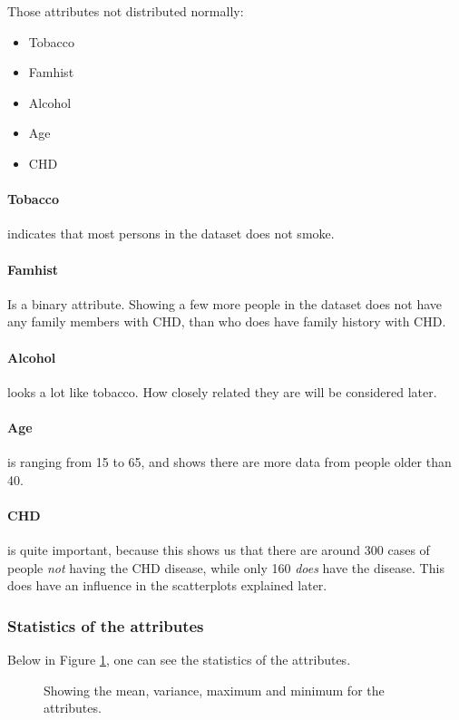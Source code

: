 Those attributes not distributed normally:
\begin{itemize}
\item Tobacco
\item Famhist
\item Alcohol
\item Age
\item CHD
\end{itemize}

\paragraph{Tobacco} indicates that most persons in the dataset does not smoke.
\paragraph{Famhist} Is a binary attribute. Showing a few more people in the dataset does not have any family members with CHD, than who does have family history with CHD.
\paragraph{Alcohol} looks a lot like tobacco. How closely related they are will be considered later.
\paragraph{Age} is ranging from 15 to 65, and shows there are more data from people older than 40.
\paragraph{CHD} is quite important, because this shows us that there are around 300 cases of people \textit{not} having the CHD disease, while only 160 \textit{does} have the disease. This does have an influence in the scatterplots explained later.

\subsubsection{Statistics of the attributes}

Below in Figure \ref{statistics}, one can see the statistics of the attributes.

\begin{figure}[H]

\caption{Showing the mean, variance, maximum and minimum for the attributes.}
\label{statistics}
\end{figure}